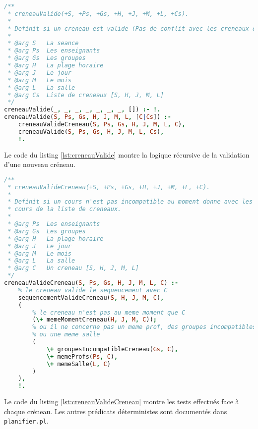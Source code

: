 \begin{lstlisting}[language=Prolog, caption=creneauValide, captionpos=b,
label={lst:creneauValide}]
/**
 * creneauValide(+S, +Ps, +Gs, +H, +J, +M, +L, +Cs).
 *
 * Definit si un creneau est valide (Pas de conflit avec les creneaux existants)
 *
 * @arg S   La seance
 * @arg Ps  Les enseignants
 * @arg Gs  Les groupes
 * @arg H   La plage horaire
 * @arg J   Le jour
 * @arg M   Le mois
 * @arg L   La salle
 * @arg Cs  Liste de creneaux [S, H, J, M, L]
 */
creneauValide(_, _, _, _, _, _, _, []) :- !.
creneauValide(S, Ps, Gs, H, J, M, L, [C|Cs]) :-
    creneauValideCreneau(S, Ps, Gs, H, J, M, L, C),
    creneauValide(S, Ps, Gs, H, J, M, L, Cs),
    !.
\end{lstlisting}

Le code du listing \ref{lst:creneauValide} montre la logique récursive de la
validation d'une nouveau créneau.

\begin{lstlisting}[language=Prolog, caption=creneauValideCreneau, captionpos=b,
label={lst:creneauValideCreneau}]
/**
 * creneauValideCreneau(+S, +Ps, +Gs, +H, +J, +M, +L, +C).
 *
 * Definit si un cours n'est pas incompatible au moment donne avec les autres
 * cours de la liste de creneaux.
 *
 * @arg Ps  Les enseignants
 * @arg Gs  Les groupes
 * @arg H   La plage horaire
 * @arg J   Le jour
 * @arg M   Le mois
 * @arg L   La salle
 * @arg C   Un creneau [S, H, J, M, L]
 */
creneauValideCreneau(S, Ps, Gs, H, J, M, L, C) :-
    % le creneau valide le sequencement avec C
    sequencementValideCreneau(S, H, J, M, C),
    (
        % le creneau n'est pas au meme moment que C
        (\+ memeMomentCreneau(H, J, M, C));
        % ou il ne concerne pas un meme prof, des groupes incompatibles
        % ou une meme salle
        (
            \+ groupesIncompatibleCreneau(Gs, C),
            \+ memeProfs(Ps, C),
            \+ memeSalle(L, C)
        )
    ),
    !.
\end{lstlisting}

Le code du listing \ref{lst:creneauValideCreneau} montre les tests effectués
face à chaque créneau. Les autres prédicats déterministes sont documentés dans
\texttt{planifier.pl}.

